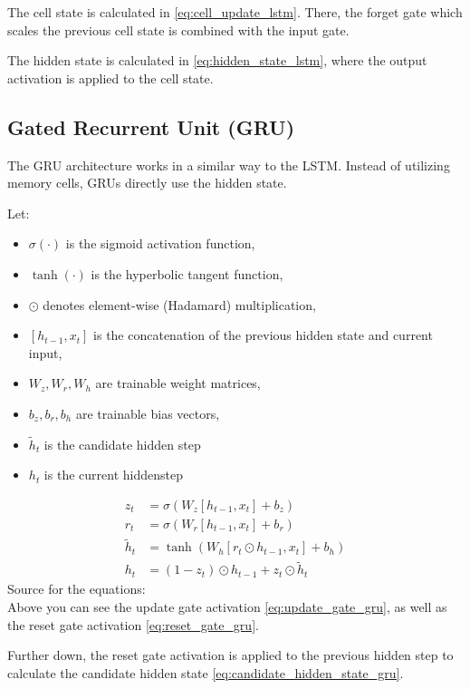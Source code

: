 \documentclass{article}
\begin{document}
The cell state is calculated in \eqref{eq:cell_update_lstm}. There, the forget gate which scales the previous cell state is combined with the input gate.

The hidden state is calculated in \eqref{eq:hidden_state_lstm}, where the output activation is applied to the cell state.

\subsection{Gated Recurrent Unit (GRU)}
The GRU architecture works in a similar way to the LSTM. Instead of utilizing memory cells, GRUs directly use the hidden state.

Let:
\begin{itemize}
    \item $\sigma(\cdot)$ is the sigmoid activation function,
    \item $\tanh(\cdot)$ is the hyperbolic tangent function,
    \item $\odot$ denotes element-wise (Hadamard) multiplication,
    \item $[h_{t-1}, x_t]$ is the concatenation of the previous hidden state and current input,
    \item $W_z, W_r, W_h$ are trainable weight matrices,
    \item $b_z, b_r, b_h$ are trainable bias vectors,
    \item $\tilde{h}_t$ is the candidate hidden step
    \item $h_t$ is the current hiddenstep
\end{itemize}

\begin{align}
    z_t &= \sigma\!\left(W_z [h_{t-1}, x_t] + b_z\right) \label{eq:update_gate_gru} \\
    r_t &= \sigma\!\left(W_r [h_{t-1}, x_t] + b_r\right) \label{eq:reset_gate_gru} \\
    \tilde{h}_t &= \tanh\!\left(W_h [r_t \odot h_{t-1}, x_t] + b_h\right) \label{eq:candidate_hidden_state_gru} \\
    h_t &= (1 - z_t) \odot h_{t-1} + z_t \odot \tilde{h}_t \label{eq:update_hidden_state_gru}
\end{align}
Source for the equations: \cite{geeksforgeeks_gru}
\\[2em]
Above you can see the update gate activation \eqref{eq:update_gate_gru}, as well as the reset gate activation \eqref{eq:reset_gate_gru}.

Further down, the reset gate activation is applied to the previous hidden step to calculate the candidate hidden state \eqref{eq:candidate_hidden_state_gru}. 
\end{document}
